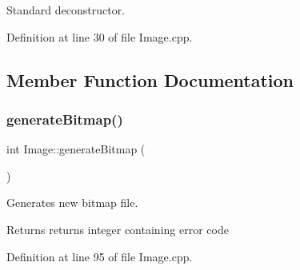 Standard deconstructor. 

Definition at line 30 of file Image.\+cpp.



\subsection{Member Function Documentation}
\mbox{\label{classImage_a3ca1ae6c1eb2846bfba066b01e6020e1}} 
\subsubsection{\texorpdfstring{generateBitmap()}{generateBitmap()}}
{\footnotesize\ttfamily int Image\+::generate\+Bitmap (\begin{DoxyParamCaption}{ }\end{DoxyParamCaption})}



Generates new bitmap file. 

\begin{DoxyReturn}{Returns}
returns integer containing error code 
\end{DoxyReturn}


Definition at line 95 of file Image.\+cpp.

